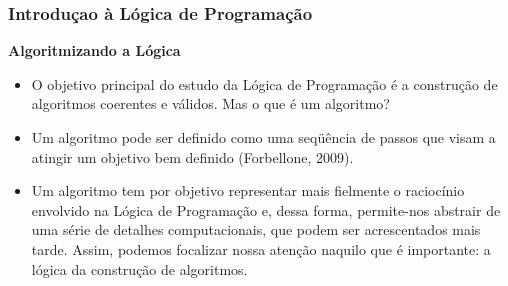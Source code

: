 \begin{frame}
	\frametitle{Introduçao à Lógica de Programação}
	\textbf{Algoritmizando a Lógica}
	\begin{itemize}
		\item O objetivo principal do estudo da Lógica de Programação é a construção de algoritmos coerentes e válidos. Mas o que é um algoritmo?
		
		\item Um algoritmo pode ser definido como uma seqüência de passos que visam a atingir um objetivo bem definido (Forbellone, 2009).
		
		\item Um algoritmo tem por objetivo representar mais fielmente o raciocínio envolvido na Lógica de Programação e, dessa forma, permite-nos abstrair de uma série de detalhes computacionais, que podem ser acrescentados mais tarde. Assim, podemos focalizar nossa atenção naquilo que é importante: a lógica da construção de algoritmos.
	\end{itemize}
\end{frame}